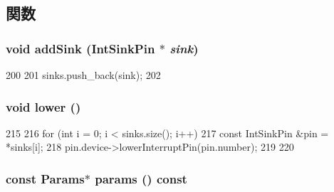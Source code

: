 \subsection{関数}
\hypertarget{classX86ISA_1_1IntSourcePin_a61bae9886ca37fefa07b8ebc2cbfa4c7}{
\subsubsection[{addSink}]{\setlength{\rightskip}{0pt plus 5cm}void addSink ({\bf IntSinkPin} $\ast$ {\em sink})}}
\label{classX86ISA_1_1IntSourcePin_a61bae9886ca37fefa07b8ebc2cbfa4c7}



\begin{DoxyCode}
200     {
201         sinks.push_back(sink);
202     }
\end{DoxyCode}
\hypertarget{classX86ISA_1_1IntSourcePin_abb6fca0f0f0ba34b180f807b0dab4e92}{
\subsubsection[{lower}]{\setlength{\rightskip}{0pt plus 5cm}void lower ()}}
\label{classX86ISA_1_1IntSourcePin_abb6fca0f0f0ba34b180f807b0dab4e92}



\begin{DoxyCode}
215     {
216         for (int i = 0; i < sinks.size(); i++) {
217             const IntSinkPin &pin = *sinks[i];
218             pin.device->lowerInterruptPin(pin.number);
219         }
220     }
\end{DoxyCode}
\hypertarget{classX86ISA_1_1IntSourcePin_acd3c3feb78ae7a8f88fe0f110a718dff}{
\subsubsection[{params}]{\setlength{\rightskip}{0pt plus 5cm}const {\bf Params}$\ast$ params () const}}
\label{classX86ISA_1_1IntSourcePin_acd3c3feb78ae7a8f88fe0f110a718dff}



